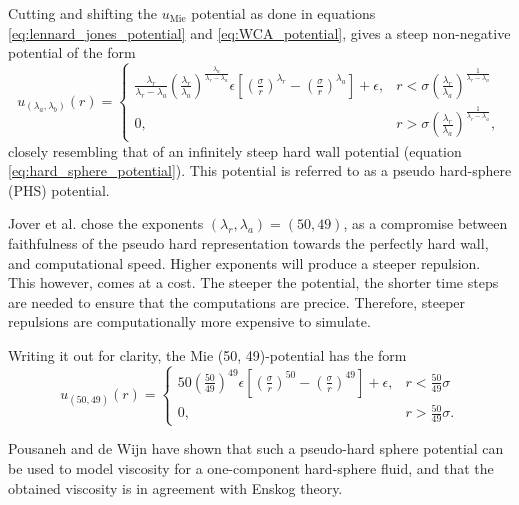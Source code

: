 Cutting and shifting the $u_{\text{Mie}}$ potential as done in equations
\eqref{eq:lennard_jones_potential} and \eqref{eq:WCA_potential},
gives a steep non-negative potential of the form
\begin{equation}
    u_{(\lambda_a, \lambda_b)}(r) = 
    \begin{cases}
        \frac{\lambda_r}{\lambda_r - \lambda_a}
        \left(\frac{\lambda_r}{\lambda_a}\right)
        ^{\frac{\lambda_a}{\lambda_r - \lambda_a}}
        \epsilon \left[
            \left(\frac{\sigma}{r}\right)^{\lambda_r} -
            \left(\frac{\sigma}{r}\right)^{\lambda_a}
        \right]
        + \epsilon,
            & r < \sigma \left(
                \frac{\lambda_r}{\lambda_a}
            \right)^\frac{1}{\lambda_r - \lambda_a} \\
        0,  & r > \sigma \left(
                \frac{\lambda_r}{\lambda_a}
            \right)^\frac{1}{\lambda_r - \lambda_a},
    \end{cases}
\end{equation}
closely resembling that of an infinitely steep hard wall potential (equation \eqref{eq:hard_sphere_potential}).
This potential is referred to as a pseudo hard-sphere (PHS) potential.

Jover et al. chose the exponents $(\lambda_r, \lambda_a) = (50, 49)$, 
as a compromise between faithfulness of the pseudo hard representation 
towards the perfectly hard wall, and computational speed.
Higher exponents will produce a steeper repulsion. 
This however, comes at a cost. 
The steeper the potential, the shorter time steps are 
needed to ensure that the computations are precice.
Therefore, steeper repulsions are computationally more expensive to simulate.

Writing it out for clarity, the Mie (50, 49)-potential has the form
\begin{equation}
    u_{(50, 49)}(r) = 
    \begin{cases}
        50
        \left(\frac{50}{49}\right)
        ^{49}
        \epsilon \left[
            \left(\frac{\sigma}{r}\right)^{50} -
            \left(\frac{\sigma}{r}\right)^{49}
        \right]
        + \epsilon,
            & r < \frac{50}{49} \sigma\\
        0,  & r > \frac{50}{49} \sigma.
    \end{cases}
\end{equation}

Pousaneh and de Wijn \cite{ref:pousaneh:shear_viscosity} 
have shown that such a pseudo-hard sphere potential 
can be used to model viscosity for a one-component hard-sphere fluid, 
and that the obtained viscosity is in agreement with Enskog theory.

